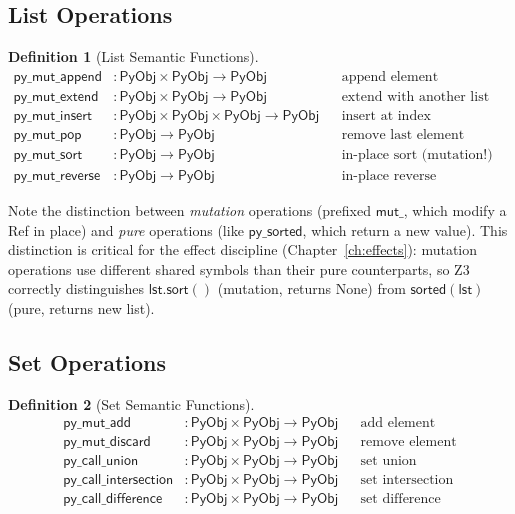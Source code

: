 \documentclass[11pt,a4paper]{report}
\theoremstyle{definition}
\newtheorem{definition}{Definition}[chapter]
\theoremstyle{plain}
\newcommand{\PyObj}{\mathsf{PyObj}}
\begin{document}
\subsection{List Operations}

\begin{definition}[List Semantic Functions]
\begin{align}
  \mathsf{py\_mut\_append} &: \PyObj \times \PyObj \to \PyObj
    && \text{append element (mutation)} \\
  \mathsf{py\_mut\_extend} &: \PyObj \times \PyObj \to \PyObj
    && \text{extend with another list} \\
  \mathsf{py\_mut\_insert} &: \PyObj \times \PyObj \times \PyObj
    \to \PyObj
    && \text{insert at index} \\
  \mathsf{py\_mut\_pop} &: \PyObj \to \PyObj
    && \text{remove last element} \\
  \mathsf{py\_mut\_sort} &: \PyObj \to \PyObj
    && \text{in-place sort (mutation!)} \\
  \mathsf{py\_mut\_reverse} &: \PyObj \to \PyObj
    && \text{in-place reverse (mutation!)}
\end{align}
\end{definition}

Note the distinction between \emph{mutation} operations (prefixed
$\mathsf{mut\_}$, which modify a Ref in place) and \emph{pure}
operations (like $\mathsf{py\_sorted}$, which return a new value).
This distinction is critical for the effect discipline
(Chapter~\ref{ch:effects}): mutation operations use different shared
symbols than their pure counterparts, so Z3 correctly distinguishes
$\mathsf{lst.sort()}$ (mutation, returns None) from
$\mathsf{sorted(lst)}$ (pure, returns new list).

\subsection{Set Operations}

\begin{definition}[Set Semantic Functions]
\begin{align}
  \mathsf{py\_mut\_add} &: \PyObj \times \PyObj \to \PyObj
    && \text{add element} \\
  \mathsf{py\_mut\_discard} &: \PyObj \times \PyObj \to \PyObj
    && \text{remove element} \\
  \mathsf{py\_call\_union} &: \PyObj \times \PyObj \to \PyObj
    && \text{set union} \\
  \mathsf{py\_call\_intersection} &: \PyObj \times \PyObj \to \PyObj
    && \text{set intersection} \\
  \mathsf{py\_call\_difference} &: \PyObj \times \PyObj \to \PyObj
    && \text{set difference}
\end{align}
\end{definition}
\end{document}
